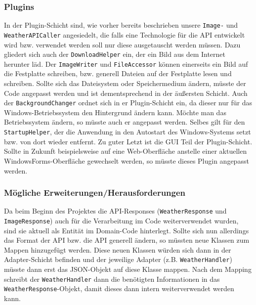 \subsubsection{Plugins}
In der Plugin-Schicht sind, wie vorher bereits beschrieben unsere \texttt{Image-} und \texttt{WeatherAPICaller} angesiedelt, die falls eine Technologie für die API entwickelt wird bzw. verwendet werden soll nur diese ausgetauscht werden müssen. Dazu gliedert sich auch der \texttt{DownloadHelper} ein, der ein Bild aus dem Internet herunter läd. Der \texttt{ImageWriter} und \texttt{FileAccessor} können einerseits ein Bild auf die Festplatte schreiben, bzw. generell Dateien auf der Festplatte lesen und schreiben. Sollte sich das Dateisystem oder Speichermedium ändern, müsste der Code angepasst werden und ist dementsprechend in der äußersten Schicht. Auch der \texttt{BackgroundChanger} ordnet sich in er Plugin-Schicht ein, da dieser nur für das Windows-Betriebssystem den Hintergrund ändern kann. Möchte man das Betriebssystem ändern, so müsste auch er angepasst werden. Selbes gilt für den \texttt{StartupHelper}, der die Anwendung in den Autostart des Windows-Systems setzt bzw. von dort wieder entfernt. Zu guter Letzt ist die GUI Teil der Plugin-Schicht. Sollte in Zukunft beispielsweise auf eine Web-Oberfläche anstelle einer aktuellen WindowsForms-Oberfläche gewechselt werden, so müsste dieses Plugin angepasst werden.
\subsubsection{Mögliche Erweiterungen/Herausforderungen}
Da beim Beginn des Projektes die API-Responses (\texttt{WeatherResponse} und \texttt{ImageResponse}) auch für die Verarbeitung im Code weiterverwendet wurden, sind sie aktuell als Entität im Domain-Code hinterlegt. Sollte sich nun allerdings das Format der API bzw. die API generell ändern, so müssten neue Klassen zum Mappen hinzugefügt werden. Diese neuen Klassen würden sich dann in der Adapter-Schicht befinden und der jeweilige Adapter (z.B. \texttt{WeatherHandler}) müsste dann erst das JSON-Objekt auf diese Klasse mappen. Nach dem Mapping schreibt der \texttt{WeatherHandler} dann die benötigten Informationen in das \texttt{WeatherResponse}-Objekt, damit dieses dann intern weiterverwendet werden kann.
